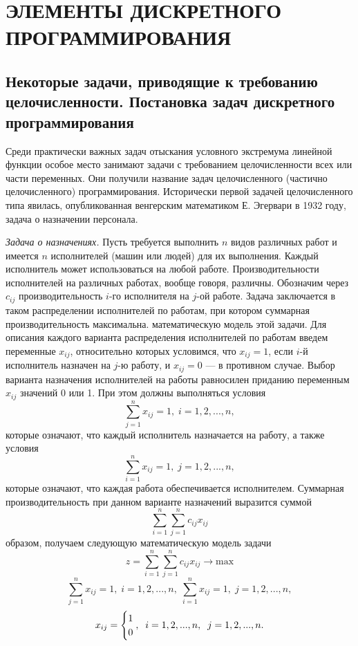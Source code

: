 \section{ЭЛЕМЕНТЫ ДИСКРЕТНОГО ПРОГРАММИРОВАНИЯ}
\subsection{Некоторые задачи, приводящие к требованию целочисленности. Постановка задач дискретного программирования }
Среди практически важных задач отыскания условного экстремума линейной функции особое место занимают задачи с требованием целочисленности всех или части переменных. Они получили название задач целочисленного (частично целочисленного) программирования. Исторически первой задачей целочисленного типа явилась, опубликованная венгерским математиком Е. Эгервари в 1932 году, задача о назначении персонала.
\par\textit{Задача о назначениях.} Пусть требуется выполнить $n$ видов различных работ и имеется $n$ исполнителей (машин или людей) для их выполнения. Каждый исполнитель может использоваться на любой работе. Производительности исполнителей на различных работах, вообще говоря, различны. Обозначим через $c_{ij}$ производительность $i$-го исполнителя на $j$-ой работе. Задача заключается в таком распределении исполнителей по работам, при котором суммарная производительность максимальна.
 математическую модель этой задачи. Для описания каждого варианта распределения исполнителей по работам введем переменные $x_{ij}$, относительно которых условимся, что $x_{ij}=1$, если $i$-й исполнитель назначен на $j$-ю работу, и $x_{ij}=0$ — в противном случае. Выбор варианта назначения исполнителей на работы равносилен приданию переменным $x_{ij}$ значений 0 или 1. При этом должны выполняться условия\\
$$\sum_{j=1}^n x_{ij} = 1, \; i = 1,2,...,n,$$
которые означают, что каждый исполнитель назначается на работу, а также условия
$$\sum_{i=1}^n x_{ij} = 1, \; j = 1,2,...,n,$$
которые означают, что каждая работа обеспечивается исполнителем. Суммарная производительность при данном варианте назначений выразится суммой
$$\sum_{i=1}^n \sum_{j=1}^n c_{ij}x_{ij}$$
 образом, получаем следующую математическую модель задачи
$$z = \sum_{i=1}^n \sum_{j=1}^n c_{ij}x_{ij}\rightarrow \textrm{max}$$
$$\sum_{j=1}^n x_{ij} = 1, \; i = 1,2,...,n,\; \sum_{i=1}^n x_{ij} = 1, \; j = 1,2,...,n,$$
$$	x_{ij} = \begin{cases}
		1\\
		0
	\end{cases}\hspace{-1em},\;\; i = 1,2,...,n,\;\;j = 1,2,...,n.
$$
